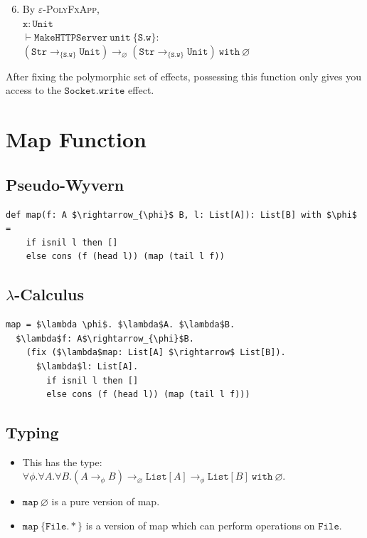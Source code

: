 \documentclass{llncs}
\newcommand{\keywadj}[1]{\mathtt{#1}}
\newcommand{\keyw}[1]{\keywadj{#1}~}
\newcommand{\kw}[1]{\keyw{ #1 }}
\newcommand{\kwa}[1]{\keywadj{ #1 }}
\begin{document}
\begin{enumerate}
	\setcounter{enumi}{5}
	\item By \textsc{$\varepsilon$-PolyFxApp}, \\
	$\kwa{x: Unit}$\\
	$\kwa{\vdash MakeHTTPServer~unit~\{S.w\}:}$\\
	$\kwa{(Str \rightarrow_{\{S.w\}} Unit) \rightarrow_{\varnothing} (Str \rightarrow_{\{S.w\}} Unit)~\kw{with} \varnothing}$
\end{enumerate}

\noindent
After fixing the polymorphic set of effects, possessing this function only gives you access to the $\kwa{Socket.write}$ effect.













\section{Map Function}

\subsection*{Pseudo-Wyvern}
\begin{lstlisting}
def map(f: A $\rightarrow_{\phi}$ B, l: List[A]): List[B] with $\phi$ =
	if isnil l then []
	else cons (f (head l)) (map (tail l f))
\end{lstlisting}

\subsection*{$\lambda$-Calculus}
\begin{lstlisting}
map = $\lambda \phi$. $\lambda$A. $\lambda$B.
  $\lambda$f: A$\rightarrow_{\phi}$B.
    (fix ($\lambda$map: List[A] $\rightarrow$ List[B]).
      $\lambda$l: List[A].
        if isnil l then []
        else cons (f (head l)) (map (tail l f)))
\end{lstlisting}

\subsection*{Typing}

\begin{itemize}
	\item This has the type: $\forall \phi. \forall A. \forall B. (A \rightarrow_{\phi} B)  \rightarrow_{\varnothing} \kwa{List}[A] \rightarrow_{\phi} \kwa{List}[B]~ \kw{with} \varnothing$.
	\item $\kwa{map}~\varnothing$ is a pure version of map.
	\item $\kwa{map}~\{ \kwa{File.*} \}$ is a version of map which can perform operations on $\kwa{File}$.
\end{itemize}
\end{document}
